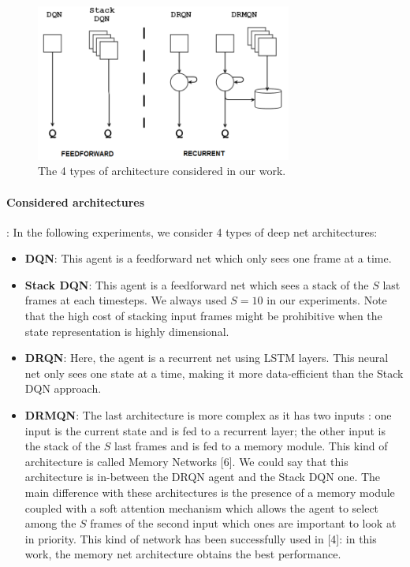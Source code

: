 \documentclass{article} %
\begin{document}
	
	\begin{figure}[!t]
		\centering
		\includegraphics[width=0.75\textwidth]{imgs/schema_archi.png}
		\caption{The 4 types of architecture considered in our work.}
		\label{archi}
	\end{figure}
	
	\paragraph{Considered architectures}: In the following experiments, we consider 4 types of deep net architectures:
	
	\begin{itemize}
		\item \textbf{DQN}: This agent is a feedforward net which only sees one frame at a time.
		\vspace{0.3cm}
		
		\item \textbf{Stack DQN}: This agent is a feedforward net which sees a stack of the $S$ last frames at each timesteps. We always used $S=10$ in our experiments. Note that the high cost of stacking input frames might be prohibitive when the state representation is highly dimensional. 
		\vspace{0.3cm}
		
		\item \textbf{DRQN}: Here, the agent is a recurrent net using LSTM layers. This neural net only sees one state at a time, making it more data-efficient than the Stack DQN approach.
		\vspace{0.3cm}
		
		\item \textbf{DRMQN}: The last architecture is more complex as it has two inputs : one input is the current state and is fed to a recurrent layer; the other input is the stack of the $S$ last frames and is fed to a memory module. This kind of architecture is called Memory Networks [6]. We could say that this architecture is in-between the DRQN agent and the Stack DQN one. The main difference with these architectures is the presence of a memory module coupled with a soft attention mechanism which allows the agent to select among the $S$ frames of the second input which ones are important to look at in priority. This kind of network has been successfully used in [4]: in this work, the memory net architecture obtains the best performance.
		\vspace{0.3cm}
	\end{itemize}
	
\end{document}
